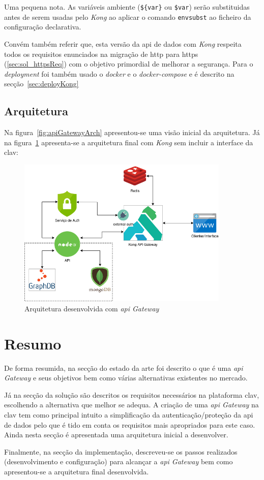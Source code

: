 Uma pequena nota. As variáveis ambiente (\verb|${var}| ou \verb|$var|) serão substituidas antes de serem usadas pelo \textit{Kong} ao aplicar o comando \texttt{envsubst} ao ficheiro da configuração declarativa.

Convém também referir que, esta versão da \acrshort{api} de dados com \textit{Kong} respeita todos os requisitos enunciados na migração de \acrshort{http} para \acrshort{https} (\ref{sec:sol_httpsReq}) com o objetivo primordial de melhorar a segurança. Para o \textit{deployment} foi também usado o \textit{docker} e o \textit{docker-compose} e é descrito na secção~\ref{sec:deployKong}

\subsection{Arquitetura}
Na figura~\ref{fig:apiGatewayArch} apresentou-se uma visão inicial da arquitetura. Já na figura~\ref{fig:apiGatewayArchFinal} apresenta-se a arquitetura final com \textit{Kong} sem incluir a interface da \acrshort{clav}: 
\begin{figure}[H]
    \centering
    \includegraphics[width=0.9\textwidth]{img/apiGatewayArchFinal.png}
    \caption{Arquitetura desenvolvida com \textit{\acrshort{api} Gateway}}\label{fig:apiGatewayArchFinal}
\end{figure}

\section{Resumo}

De forma resumida, na secção do estado da arte foi descrito o que é uma \textit{\acrshort{api} Gateway} e seus objetivos bem como várias alternativas existentes no mercado.

Já na secção da solução são descritos os requisitos necessários na plataforma \acrshort{clav}, escolhendo a alternativa que melhor se adequa.
A criação de uma \textit{\acrshort{api} Gateway} na \acrshort{clav} tem como principal intuito a simplificação da autenticação/proteção da \acrshort{api} de dados pelo que é tido em conta os requisitos mais apropriados para este caso.
Ainda nesta secção é apresentada uma arquitetura inicial a desenvolver.

Finalmente, na secção da implementação, descreveu-se os passos realizados (desenvolvimento e configuração) para alcançar a \textit{\acrshort{api} Gateway} bem como apresentou-se a arquitetura final desenvolvida.
